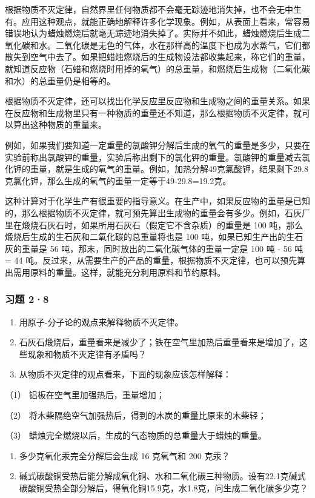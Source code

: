 根据物质不灭定律，自然界里任何物质都不会毫无踪迹地消失掉，也不会无中生有。应用这种观点，就能正确地解释许多化学现象。例如，从表面上看来，常容易错误地认为蜡烛燃烧后就毫无踪迹地消失掉了。实际并不如此，蜡烛燃烧后生成二氧化碳和水。二氧化碳是无色的气体，水在那样高的温度下也成为水蒸气，它们都散失到空气中去了。如果把蜡烛燃烧后的生成物设法都收集起来，称它们的重量，就知道反应物（石蜡和燃烧时用掉的氧气）的总重量，和燃烧后生成物（二氧化碳和水）的总重量仍是相等的。

根据物质不灭定律，还可以找出化学反应里反应物和生成物之间的重量关系。如果在反应物和生成物里只有一种物质的重量还不知道，那么根据物质不灭定律，就可以算出这种物质的重量来。

例如，如果我们要知道一定重量的氯酸钾分解后生成的氧气的重量是多少，只要在实验前称出氯酸钾的重量，实验后称出剩下的氯化钾的重量。氯酸钾的重量减去氯化钾的重量，就是生成的氧气的重量。例如，加热分解49克氯酸钾，结果剩下29.8克氯化钾，那么生成的氧气的重量一定等于49-29.8=19.2克。

这种计算对于化学生产有很重要的指导意义。在生产中，如果反应物的重量是已知的，那么根据物质不灭定律，就可预先算出生成物的重量会有多少。例如，石灰厂里在煅烧石灰石时，如果所用石灰石（假定它不含杂质）的重量是
100 吨，那么煅烧后生成的生石灰和二氧化碳的总重量将也是 100
吨，如果已知生产出的生石灰的重量是 56
吨，那末，同时放出的二氧化碳气体的重量一定是 100 吨 - 56 吨 = 44
吨。反过来，从需要生产的产品的重量，根据物质不灭定律，也可以预先算出需用原料的重量。这样，就能充分利用原料和节约原料。

\subsubsection{习题 2·8}

\begin{enumerate}
\item
  用原子-分子论的观点来解释物质不灭定律。
\item
  石灰石煅烧后，重量看来是减少了；铁在空气里加热后重量看来是增加了，这些现象和物质不灭定律有矛盾吗？
\item
  从物质不灭定律的观点看来，下面的现象应该怎样解释：
\end{enumerate}

（1） 铝板在空气里加强热后，重量增加；

（2） 将木柴隔绝空气加强热后，得到的木炭的重量比原来的木柴轻；

（3） 蜡烛完全燃烧以后，生成的气态物质的总重量大于蜡烛的重量。

\begin{enumerate}[start=4]
\item
  多少克氧化汞完全分解后会生成 16 克氧气和 200 克汞？
\item
  碱式碳酸铜受热后能分解成氧化铜、水和二氧化碳三种物质。设有22.1克碱式碳酸铜受热全部分解后，得氧化铜15.9克，水1.8克，问生成二氧化碳多少克？
\end{enumerate}


